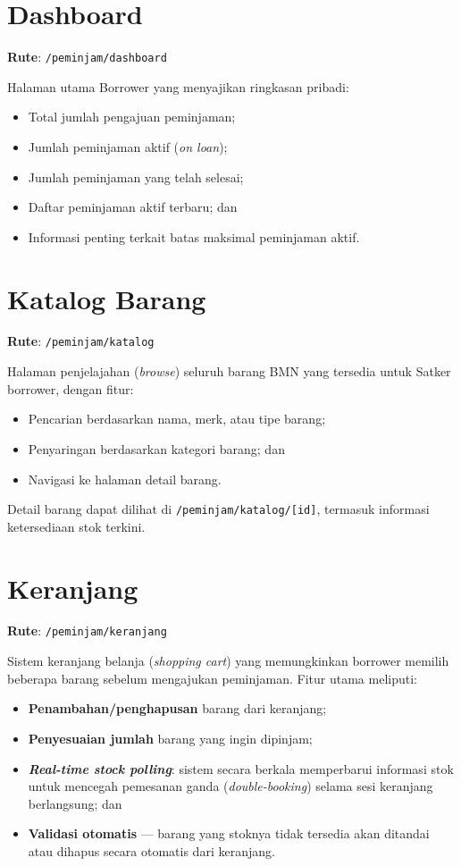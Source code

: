 \documentclass[
  12pt,
  a4paper,
  oneside,
  final
]{report}
\begin{document}
\section{Dashboard}
\textbf{Rute}: \texttt{/peminjam/dashboard}

Halaman utama Borrower yang menyajikan ringkasan pribadi:
\begin{itemize}
  \item Total jumlah pengajuan peminjaman;
  \item Jumlah peminjaman aktif ({\it on loan});
  \item Jumlah peminjaman yang telah selesai;
  \item Daftar peminjaman aktif terbaru; dan
  \item Informasi penting terkait batas maksimal peminjaman aktif.
\end{itemize}

\section{Katalog Barang}
\textbf{Rute}: \texttt{/peminjam/katalog}

Halaman penjelajahan ({\it browse}) seluruh barang BMN yang tersedia
untuk Satker borrower, dengan fitur:
\begin{itemize}
  \item Pencarian berdasarkan nama, merk, atau tipe barang;
  \item Penyaringan berdasarkan kategori barang; dan
  \item Navigasi ke halaman detail barang.
\end{itemize}

Detail barang dapat dilihat di \texttt{/peminjam/katalog/[id]},
termasuk informasi ketersediaan stok terkini.

\section{Keranjang}
\textbf{Rute}: \texttt{/peminjam/keranjang}

Sistem keranjang belanja ({\it shopping cart}) yang memungkinkan
borrower memilih beberapa barang sebelum mengajukan peminjaman.
Fitur utama meliputi:
\begin{itemize}
  \item {\bfseries Penambahan/penghapusan} barang dari keranjang;
  \item {\bfseries Penyesuaian jumlah} barang yang ingin dipinjam;
  \item {\bfseries {\it Real-time stock polling}}: sistem secara berkala
        memperbarui informasi stok untuk mencegah pemesanan ganda
        ({\it double-booking}) selama sesi keranjang berlangsung; dan
  \item {\bfseries Validasi otomatis} --- barang yang stoknya tidak
        tersedia akan ditandai atau dihapus secara otomatis dari
        keranjang.
\end{itemize}
\end{document}
